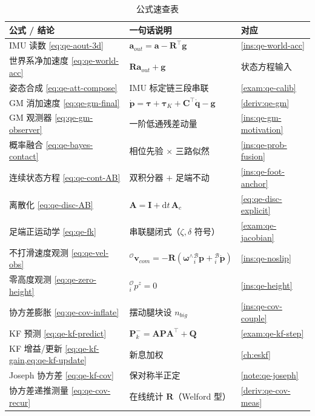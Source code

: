 \begin{table}[H]\centering\small
\caption{公式速查表}
\begin{tabular}{lll}
\toprule
公式 / 结论 & 一句话说明 & 对应 \\
\midrule
IMU 读数 \cref{eq:qe-aout-3d} & $\boldsymbol a_{out}=\boldsymbol a-\mathbf{R}^\top\boldsymbol g$ & \cref{ins:qe-world-acc} \\
世界系净加速度 \cref{eq:qe-world-acc} & $\mathbf{R}\boldsymbol a_{out}+\boldsymbol g$ & 状态方程输入 \\
姿态合成 \cref{eq:qe-att-compose} & IMU 标定链三段串联 & \cref{exam:qe-calib} \\
GM 消加速度 \cref{eq:qe-gm-final} & $\dot{\boldsymbol p}=\boldsymbol\tau+\boldsymbol\tau_K+\mathbf{C}^\top\dot{\boldsymbol q}-\boldsymbol g$ & \cref{deriv:qe-gm} \\
GM 观测器 \cref{eq:qe-gm-observer} & 一阶低通残差动量 & \cref{ins:qe-gm-motivation} \\
概率融合 \cref{eq:qe-bayes-contact} & 相位先验 $\times$ 三路似然 & \cref{ins:qe-prob-fusion} \\
连续状态方程 \cref{eq:qe-cont-AB} & 双积分器 $+$ 足端不动 & \cref{ins:qe-foot-anchor} \\
离散化 \cref{eq:qe-disc-AB} & $\mathbf{A}=\mathbf{I}+\mathrm{d}t\,\mathbf{A}_c$ & \cref{eq:qe-disc-explicit} \\
足端正运动学 \cref{eq:qe-fk} & 串联腿闭式（$\zeta,\delta$ 符号） & \cref{exam:qe-jacobian} \\
不打滑速度观测 \cref{eq:qe-vel-obs} & ${}^{\mathcal{O}}\boldsymbol v_{com}=-\mathbf{R}(\boldsymbol\omega^\wedge{}^{\mathcal{B}}_{i}\boldsymbol p+{}^{\mathcal{B}}_{i}\dot{\boldsymbol p})$ & \cref{ins:qe-noslip} \\
零高度观测 \cref{eq:qe-zero-height} & ${}^{\mathcal{O}}_{i}p^z=0$ & \cref{ins:qe-height} \\
协方差膨胀 \cref{eq:qe-cov-inflate} & 摆动腿块设 $n_{big}$ & \cref{ins:qe-cov-couple} \\
KF 预测 \cref{eq:qe-kf-predict} & $\mathbf{P}_k^-=\mathbf{A}\mathbf{P}\mathbf{A}^\top+\mathbf{Q}$ & \cref{exam:qe-kf-step} \\
KF 增益/更新 \cref{eq:qe-kf-gain,eq:qe-kf-update} & 新息加权 & \cref{ch:eskf} \\
Joseph 协方差 \cref{eq:qe-kf-cov} & 保对称半正定 & \cref{note:qe-joseph} \\
协方差递推测量 \cref{eq:qe-cov-recur} & 在线统计 $\mathbf{R}$（Welford 型） & \cref{deriv:qe-cov-meas} \\
\bottomrule
\end{tabular}
\end{table}

